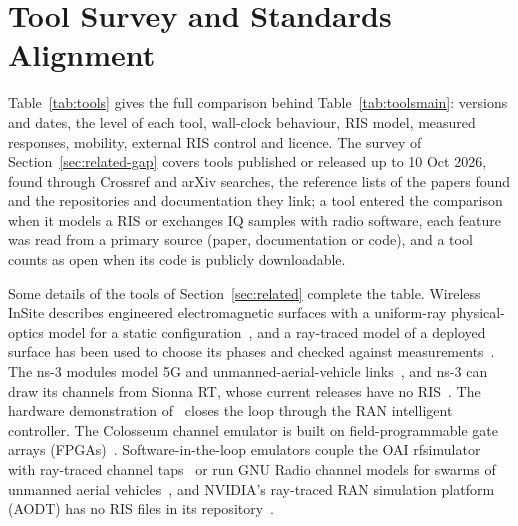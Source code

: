 \section{Tool Survey and Standards Alignment}\label{app:survey}

Table~\ref{tab:tools} gives the full comparison behind
Table~\ref{tab:toolsmain}: versions and dates, the level of each tool, wall-clock behaviour,
RIS model, measured responses, mobility, external RIS control and licence. The survey of
Section~\ref{sec:related-gap} covers tools published or released up to 10 Oct 2026, found
through Crossref and arXiv searches, the reference lists of the papers found and the
repositories and documentation they link; a tool entered the comparison when it models a RIS
or exchanges IQ samples with radio software, each feature was read from a primary source
(paper, documentation or code), and a tool counts as open when its code is publicly
downloadable.



Some details of the tools of Section~\ref{sec:related} complete the table. Wireless InSite
describes engineered electromagnetic surfaces with a uniform-ray physical-optics model for a
static configuration~\cite{RemcomEES,DeJong2022EES}, and a ray-traced model of a deployed
surface has been used to choose its phases and checked against
measurements~\cite{Karakelle2026DTRIS}. The ns-3 modules model 5G and unmanned-aerial-vehicle
links~\cite{Pagin2022IRSAF,Grieco2024IoDSimIRS}, and ns-3 can draw its channels from Sionna RT,
whose current releases have no RIS~\cite{Zubow2024Ns3Sionna}. The hardware demonstration
of~\cite{Sahin2025RISmeetsORAN} closes the loop through the RAN intelligent controller. The
Colosseum channel emulator is built on field-programmable gate arrays
(FPGAs)~\cite{Bonati2021Colosseum}. Software-in-the-loop emulators couple the OAI rfsimulator
with ray-traced channel taps~\cite{Iye2025OWDT} or run GNU Radio channel models for swarms of
unmanned aerial vehicles~\cite{Mastronarde2022RFSITL}, and NVIDIA's ray-traced RAN simulation
platform (AODT) has no RIS files in its repository~\cite{AODTRepo}.

